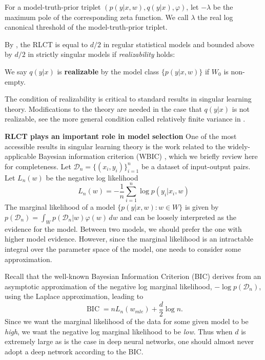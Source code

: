 \documentclass{article} %
\begin{document}
\begin{definition}
For a model-truth-prior triplet $(p(y|x,w),q(y|x),\varphi)$, let $-\lambda$ be the maximum pole of the corresponding zeta function. We call $\lambda$ the real log canonical threshold of the model-truth-prior triplet.
\label{def:RLCT}
\end{definition}

By {\citet[Theorem 6.4]{watanabe_algebraic_2009}}, the RLCT is equal to $d/2$ in regular statistical models and bounded above by $d/2$ in strictly singular models if \textit{realizability} holds:
 \begin{definition}
	We say $q(y|x)$ is \textbf{realizable} by the model class $\{p(y|x,w)\}$ if $W_0$ is non-empty.
\end{definition}
The condition of realizability is critical to standard results in singular learning theory. Modifications to the theory are needed in the case that $q(y|x)$ is not realizable, see the more general condition called relatively finite variance in \citet{watanabe_mathematical_2018}.

\textbf{RLCT plays an important role in model selection}
One of the most accessible results in singular learning theory is the work related to the widely-applicable Bayesian information criterion (WBIC) \citet{watanabe_widely_2013}, which we briefly review here for completeness.
Let $\mathcal D_n =  \{(x_i,y_i)\}_{i=1}^n$ be a dataset of input-output pairs.  
Let $L_n(w)$ be the negative log likelihood
\begin{equation}
L_n(w) = -\frac{1}{n} \sum_{i=1}^n \log p(y_i |x_i, w)
\label{eq:nll}
\end{equation}
The marginal likelihood of a model $\{p(y|x,w): w \in W\}$ is given by
$
p(\mathcal D_n) = \int_W p(\mathcal D_n|w) \varphi(w) \,dw
$
and can be loosely interpreted as the evidence for the model. Between two models, we should prefer the one with higher model evidence.
However, since the marginal likelihood is an intractable integral over the parameter space of the model, one needs to consider some approximation.

Recall that the well-known Bayesian Information Criterion (BIC) derives from an asymptotic approximation of the negative log marginal likelihood, $-\log p(\mathcal D_n)$, using the Laplace approximation, leading to
\[
\operatorname{BIC} = nL_n( w_{mle}) + \frac{d}{2} \log n.
\]
Since we want the marginal likelihood of the data for some given model to be \textit{high}, we want the negative log marginal likelihood to be \textit{low}. Thus when $d$ is extremely large as is the case in deep neural networks, one should almost never adopt a deep network according to the BIC. 
\end{document}
